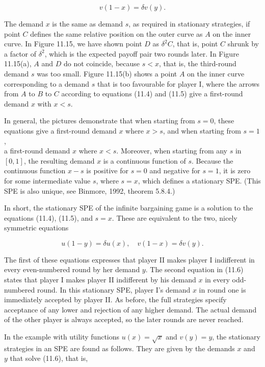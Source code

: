 \documentclass[12pt]{article}
\begin{document}
\begin{equation*}
v(1-x)=\delta v(y) . \tag{11.5}
\end{equation*}


The demand $x$ is the same as demand $s$, as required in stationary strategies, if point $C$ defines the same relative position on the outer curve as $A$ on the inner curve. In Figure 11.15, we have shown point $D$ as $\delta^{2} C$, that is, point $C$ shrunk by a factor of $\delta^{2}$, which is the expected payoff pair two rounds later. In Figure 11.15(a), $A$ and $D$ do not coincide, because $s<x$, that is, the third-round demand $s$ was too small. Figure 11.15(b) shows a point $A$ on the inner curve corresponding to a demand $s$ that is too favourable for player I, where the arrows from $A$ to $B$ to $C$ according to equations (11.4) and (11.5) give a first-round demand $x$ with $x<s$.

In general, the pictures demonstrate that when starting from $s=0$, these equations give a first-round demand $x$ where $x>s$, and when starting from $s=1$,\\
a first-round demand $x$ where $x<s$. Moreover, when starting from any $s$ in $[0,1]$, the resulting demand $x$ is a continuous function of $s$. Because the continuous function $x-s$ is positive for $s=0$ and negative for $s=1$, it is zero for some intermediate value $s$, where $s=x$, which defines a stationary SPE. (This SPE is also unique, see Binmore, 1992, theorem 5.8.4.)

In short, the stationary SPE of the infinite bargaining game is a solution to the equations (11.4), (11.5), and $s=x$. These are equivalent to the two, nicely symmetric equations


\begin{equation*}
u(1-y)=\delta u(x), \quad v(1-x)=\delta v(y) . \tag{11.6}
\end{equation*}


The first of these equations expresses that player II makes player I indifferent in every even-numbered round by her demand $y$. The second equation in (11.6) states that player I makes player II indifferent by his demand $x$ in every odd-numbered round. In this stationary SPE, player I's demand $x$ in round one is immediately accepted by player II. As before, the full strategies specify acceptance of any lower and rejection of any higher demand. The actual demand of the other player is always accepted, so the later rounds are never reached.

In the example with utility functions $u(x)=\sqrt{x}$ and $v(y)=y$, the stationary strategies in an SPE are found as follows. They are given by the demands $x$ and $y$ that solve (11.6), that is,
\end{document}

